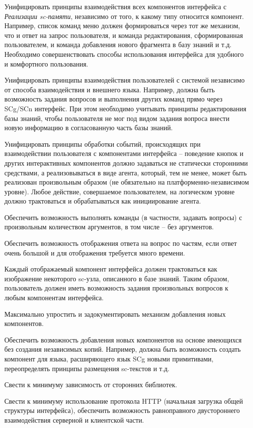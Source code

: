 \begin{textitemize}
	\item Унифицировать принципы взаимодействия всех компонентов интерфейса с \textit{Реализации sc-памяти}, независимо от того, к какому типу относится компонент. Например, список команд меню должен формироваться через тот же механизм, что и ответ на запрос пользователя, и команда редактирования, сформированная пользователем, и команда добавления нового фрагмента в базу знаний и т.д. Необходимо совершенствовать способы использования интерфейса для удобного и комфортного пользования.
	\item Унифицировать принципы взаимодействия пользователей с системой независимо от способа взаимодействия и внешнего языка. Например, должна быть возможность задания вопросов и выполнения других команд прямо через SCg/SCn интерфейс. При этом необходимо учитывать принципы редактирования базы знаний, чтобы пользователя не мог под видом задания вопроса внести новую информацию в согласованную часть базы знаний.
	\item Унифицировать принципы обработки событий, происходящих при взаимодействии пользователя с компонентами интерфейса -- поведение кнопок и других интерактивных компонентов должно задаваться не статически сторонними средствами, а реализовываться в виде агента, который, тем не менее, может быть реализован произвольным образом (не обязательно на платформенно-независимом уровне). Любое действие, совершаемое пользователем, на логическом уровне должно трактоваться и обрабатываться как инициирование агента.
	\item Обеспечить возможность выполнять команды (в частности, задавать вопросы) с произвольным количеством аргументов, в том числе -- без аргументов.
	\item Обеспечить возможность отображения ответа на вопрос по частям, если ответ очень большой и для отображения требуется много времени.
	\item Каждый отображаемый компонент интерфейса должен трактоваться как изображение некоторого sc-узла, описанного в базе знаний. Таким образом, пользователь должен иметь возможность задания произвольных вопросов к любым компонентам интерфейса.
	\item Максимально упростить и задокументировать механизм добавления новых компонентов.
	\item Обеспечить возможность добавления новых компонентов на основе имеющихся без создания независимых копий. Например, должна быть возможность создать компонент для языка, расширяющего язык SCg новыми примитивами, переопределять принципы размещения sc-текстов и т.д.
	\item Свести к минимуму зависимость от сторонних библиотек.
	\item Свести к минимуму использование протокола HTTP (начальная загрузка общей структуры интерфейса), обеспечить возможность равноправного двустороннего взаимодействия серверной и клиентской части.
\end{textitemize}

